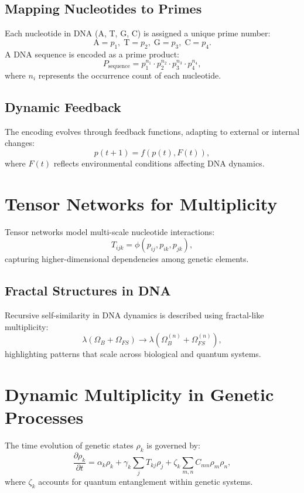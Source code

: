 \documentclass[11pt]{article}
\begin{document}
\subsection{Mapping Nucleotides to Primes}
Each nucleotide in DNA (A, T, G, C) is assigned a unique prime number:
\begin{equation}
    \text{A} = p_1, \; \text{T} = p_2, \; \text{G} = p_3, \; \text{C} = p_4.
\end{equation}
A DNA sequence is encoded as a prime product:
\begin{equation}
    P_{\text{sequence}} = p_1^{n_1} \cdot p_2^{n_2} \cdot p_3^{n_3} \cdot p_4^{n_4},
\end{equation}
where \( n_i \) represents the occurrence count of each nucleotide.

\subsection{Dynamic Feedback}
The encoding evolves through feedback functions, adapting to external or internal changes:
\begin{equation}
    p(t+1) = f(p(t), F(t)),
\end{equation}
where \( F(t) \) reflects environmental conditions affecting DNA dynamics.

\section{Tensor Networks for Multiplicity}
Tensor networks model multi-scale nucleotide interactions:
\begin{equation}
    T_{ijk} = \phi(p_{ij}, p_{ik}, p_{jk}),
\end{equation}
capturing higher-dimensional dependencies among genetic elements.

\subsection{Fractal Structures in DNA}
Recursive self-similarity in DNA dynamics is described using fractal-like multiplicity:
\begin{equation}
    \lambda(\Omega_B + \Omega_{FS}) \rightarrow \lambda(\Omega_B^{(n)} + \Omega_{FS}^{(n)}),
\end{equation}
highlighting patterns that scale across biological and quantum systems.

\section{Dynamic Multiplicity in Genetic Processes}
The time evolution of genetic states \( \rho_k \) is governed by:
\begin{equation}
    \frac{\partial \rho_k}{\partial t} = \alpha_k \rho_k + \gamma_k \sum_{j} T_{kj} \rho_j + \zeta_k \sum_{m,n} C_{mn} \rho_m \rho_n,
\end{equation}
where \( \zeta_k \) accounts for quantum entanglement within genetic systems.
\end{document}
